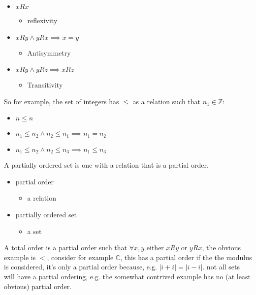 \documentclass[a4paper,11pt,twoside]{article}
\begin{document}
\begin{itemize}
\item \(x R x\)

\begin{itemize}
\item reflexivity
\end{itemize}

\item \(x R y \land y R x \implies x = y\)

\begin{itemize}
\item Antisymmetry
\end{itemize}

\item \(x R y \land y R z \implies x R z\)

\begin{itemize}
\item Transitivity
\end{itemize}
\end{itemize}

So for example, the set of integers has \(\leq\) as a relation such that
\(n_1\in \mathbb{Z}:\)

\begin{itemize}
\item \(n\leq n\)

\item \(n_1\leq n_2 \land n_2 \leq n_1 \implies n_1=n_2\)

\item \(n_1\leq n_2 \land n_2 \leq n_3 \implies n_1\leq n_3\)
\end{itemize}

A partially ordered set is one with a relation that is a partial order.

\begin{itemize}
\item partial order

\begin{itemize}
\item a relation
\end{itemize}

\item partially ordered set

\begin{itemize}
\item a set
\end{itemize}
\end{itemize}

A total order is a partial order such that \(\forall x,y\) either \(x R y\)
or \(y R x\), the obvious example is \(<\), consider for example
\(\mathbb{C}\), this has a partial order if the the modulus is considered,
it's only a partial order because, e.g.
\(\left\lvert i+i \right\rvert= \left\lvert i-i \right\rvert\). not all
sets will have a partial ordering, e.g. the somewhat contrived example
has no (at least obvious) partial order.
\end{document}
